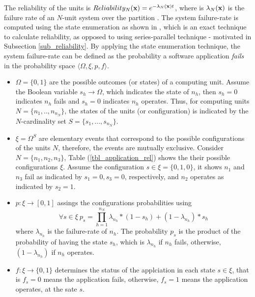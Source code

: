 The reliability of the units is $Reliability_N(\textbf{x})=e^{-\lambda_N(\textbf{x}) t}$, where is $\lambda_N(\textbf{x})$ is the failure rate of an $N$-unit system over the partition \ttx. The system failure-rate is computed using the state enumeration as shown in \cite{Lucet1999ExactReliability}, which is an exact technique to calculate reliability, as opposed to using series-parallel technique - motivated in Subsection \ref{sub_reliability}. By applying the state enumeration technique, the system failure-rate can be defined as the probability a software application \textit{fails} in the probability space $\langle \Omega,\xi,p,f\rangle$.
\begin{itemize}
	\item $\Omega=\{0,1\}$ are the possible outcomes (or states) of a computing unit. Assume the Boolean variable $s_h\rightarrow\Omega$, which indicates the state of $n_h$, then $s_h=0$ indicates $n_h$ fails and $s_h=0$ indicates $n_h$ operates. Thus, for computing units $N=\{n_1,..,n_{n_N}\}$, the states of the units (or configuration) is indicated by the $N$-cardinality set $S=\{s_1,...,s_{n_N}\}$.
	
	\item $\xi=\Omega^S$ are elementary events that correspond to the possible configurations of the units $N$, therefore, the events are mutually exclusive. Consider $N=\{n_1,n_2,n_3\}$, Table (\ref{tbl_application_rel}) shows the their possible configurations $\xi$. Assume the configuration $s\in \xi=\{0,1,0\}$, it shows $n_1$ and $n_3$ fail as indicated by $s_1=0,s_3=0$, respectively, and $n_2$ operates as indicated by $s_2=1$. 
	
	\item $p:\xi\rightarrow[0,1]$ assings the configurations probabilities using
	\[\forall s\in \xi\  p_s=\prod_{h=1}^{n_N}{\lambda_{n_h}*(1-s_h)+(1-\lambda_{n_h})*s_h}\]
	where $\lambda_{n_h}$ is the failure-rate of $n_h$. The probability $p_s$ is the product of the probability of having the state $s_h$, which is $\lambda_{n_h}$ if $n_h$ fails, otherwise, $(1-\lambda_{n_h})$ if $n_h$ operates.
	
	\item $f:\xi\rightarrow \{0,1\}$ determines the status of the applciation in each state $s\in\xi$, that is $f_s=0$ means the application fails, otherwise, $f_s=1$ means the application operates, at the sate $s$.
\end{itemize}

